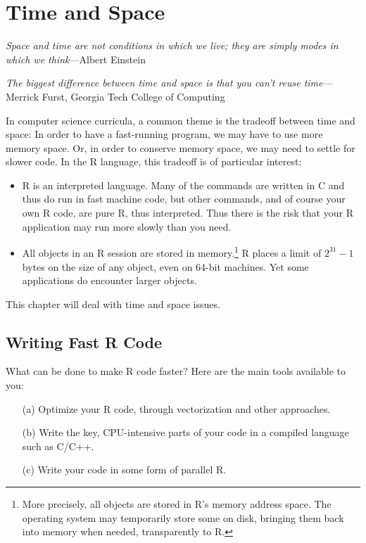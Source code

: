 \chapter{Time and Space} 
\label{chap:fastcode}

{\it Space and time are not conditions in which we live; they are simply
modes in which we think}---Albert Einstein

{\it The biggest difference between time and space is that you can't
reuse time}---Merrick Furst, Georgia Tech College of Computing

In computer science curricula, a common theme is the tradeoff between
time and space:  In order to have a fast-running program, we may have to
use more memory space.  Or, in order to conserve memory space, we may
need to settle for slower code.  In the R language, this tradeoff is of
particular interest:

\begin{itemize}

\item R is an interpreted language.  Many of the commands are written in
C and thus do run in fast machine code, but other commands, and of course
your own R code, are pure R, thus interpreted.  Thus there is the risk
that your R application may run more slowly than you need.  

\item All objects in an R session are stored in memory.\footnote{More
precisely, all objects are stored in R's memory address space.  The
operating system may temporarily store some on disk, bringing them back
into memory when needed, transparently to R.}  R places a limit of
$2^{31}-1$ bytes on the size of any object, even on 64-bit machines.
Yet some applications do encounter larger objects.

\end{itemize}

\noindent
This chapter will deal with time and space issues.

\section{Writing Fast R Code}

What can be done to make R code faster?  Here are the main tools
available to you:

\begin{itemize}

\item [(a)] Optimize your R code, through vectorization and other
approaches.

\item [(b)] Write the key, CPU-intensive parts of your code in a compiled
language such as C/C++.

\item [(c)] Write your code in some form of parallel R.

\end{itemize}

